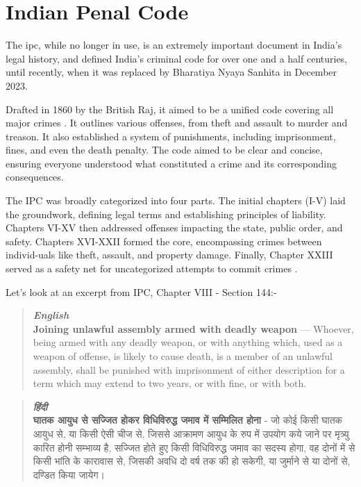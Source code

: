 \section{Indian Penal Code}

The \gls{ipc}, while no longer in use, is an extremely important document in India's legal history, and defined India's criminal code for over one and a half centuries, until recently, when it was replaced by Bharatiya Nyaya Sanhita in December 2023. 

Drafted in 1860 by the British Raj, it aimed to be a unified code covering all major crimes \cite{devadas2016history}. It outlines various offenses, from theft and assault to murder and treason. It also established a system of punishments, including imprisonment, fines, and even the death penalty. The code aimed to be clear and concise, ensuring everyone understood what constituted a crime and its corresponding consequences.

The IPC was broadly categorized into four parts. The initial chapters (I-V) laid the groundwork, defining legal terms and establishing principles of liability. Chapters VI-XV then addressed offenses impacting the state, public order, and safety. Chapters XVI-XXII formed the core, encompassing crimes between individ-uals like theft, assault, and property damage. Finally, Chapter XXIII served as a safety net for uncategorized attempts to commit crimes \cite{devadas2016history}.

Let's look at an excerpt from IPC, Chapter VIII - Section 144:-

\begin{quote}
    \emph{\textbf{English}} \\ \textbf{Joining unlawful assembly armed with deadly weapon} — Whoever, being armed with any deadly weapon, or with anything which, used as a weapon of offense, is likely to cause death, is a member of an unlawful assembly, shall be punished with imprisonment of either description for a term which may extend to two years, or with fine, or with both.
\end{quote}

\begin{quote}
\emph{\textbf{{\hindifont हिंदी}}} \\
 \textbf{{\hindifont घातक आयुध से सज्जित होकर विधिविरुद्ध जमाव में सम्मिलित होना}} -  {\hindifont जो कोई किसी घातक आयुध से, या किसी ऐसी चीज से, जिससे आक्रामण आयुध के रुप में उपयोग कये जाने पर मृत्र्यु कारित होनी सम्भाव्य है, सज्जित होते हुए किसी विधिविरुद्ध जमाव का सदस्य होगा, वह दोनों में से किसी भांति के कारावास से, जिसकी अवधि दो वर्ष तक की हो सकेगी, या जुर्माने से या दोनों से, दण्डित किया जायेग। }
\end{quote}


